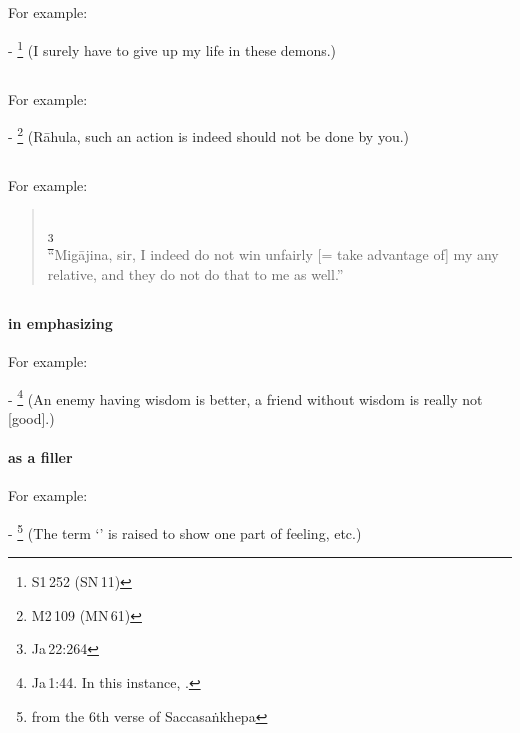 \subsection*{}\label{nip:kaamadm}
For example:\par
- \footnote{S1\,252 (SN\,11)} (I surely have to give up my life in these demons.) \par

\subsection*{}\label{nip:sasakkadm}
For example:\par
- \footnote{M2\,109 (MN\,61)} (R\=ahula, such an action is indeed should not be done by you.) \par

\subsection*{}\label{nip:jaatucche}
For example:\par
\begin{quote}
\\
\footnote{Ja\,22:264}\\[1.5mm]
``Mig\=ajina, sir, I indeed do not win unfairly [= take advantage of] my any relative, and they do not do that to me as well.''
\end{quote}

\subsection*{}\label{nip:tu}
\paragraph*{ in emphasizing} For example:\par
- \footnote{Ja\,1:44. In this instance, .} (An enemy having wisdom is better, a friend without wisdom is really not [good].) \par
\paragraph*{ as a filler} For example:\par
- \footnote{from the 6th verse of Saccasa\.nkhepa} (The term `' is raised to show one part of feeling, etc.) \par

